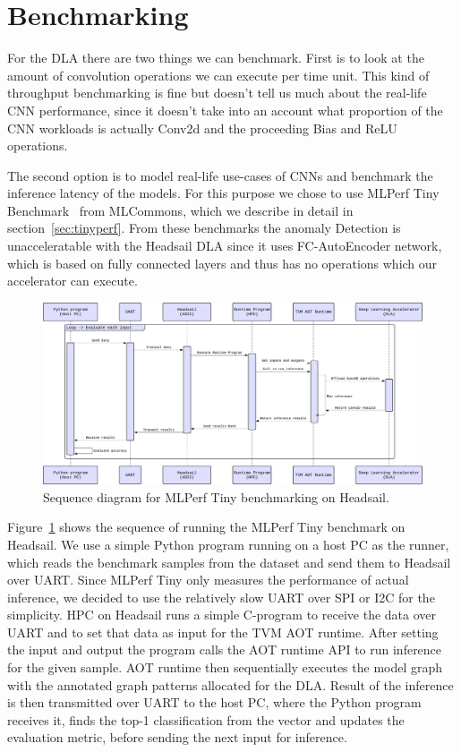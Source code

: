 \documentclass[12pt,a4paper,english
]{tunithesis}
\begin{document}
\section{Benchmarking}
For the DLA there are two things we can benchmark. First is to look at the amount of convolution operations we can execute per time unit. This kind of throughput benchmarking is fine but doesn't tell us much about the real-life CNN performance, since it doesn't take into an account what proportion of the CNN workloads is actually Conv2d and the proceeding Bias and ReLU operations.

The second option is to model real-life use-cases of CNNs and benchmark the inference latency of the models. For this purpose we chose to use MLPerf Tiny Benchmark~\cite{tinyperf} from MLCommons, which we describe in detail in section~\ref{sec:tinyperf}.
From these benchmarks the anomaly Detection is unacceleratable with the Headsail DLA since it uses FC-AutoEncoder network, which is based on fully connected layers and thus has no operations which our accelerator can execute.

\begin{figure}[h]
\centering
\includegraphics[width=\linewidth]{img/benchmark-sequence.pdf}
\caption{Sequence diagram for MLPerf Tiny benchmarking on Headsail.}
\label{fig:dla_sequence}
\end{figure}

Figure~\ref{fig:dla_sequence} shows the sequence of running the MLPerf Tiny benchmark on Headsail. We use a simple Python program running on a host PC as the runner, which reads the benchmark samples from the dataset and send them to Headsail over UART. Since MLPerf Tiny only measures the performance of actual inference, we decided to use the relatively slow UART over SPI or I2C for the simplicity. HPC on Headsail runs a simple C-program to receive the data over UART and to set that data as input for the TVM AOT runtime. After setting the input and output the program calls the AOT runtime API to run inference for the given sample. AOT runtime then sequentially executes the model graph with the annotated graph patterns allocated for the DLA. Result of the inference is then transmitted over UART to the host PC, where the Python program receives it, finds the top-1 classification from the vector and updates the evaluation metric, before sending the next input for inference.
\end{document}
